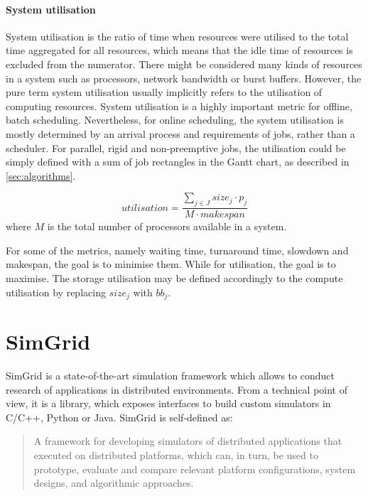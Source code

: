 \documentclass[thesis-en.tex]{subfiles}
\begin{document}
\paragraph{System utilisation}
System utilisation is the ratio of time when resources were utilised to the total time aggregated for all resources, which means that the idle time of resources is excluded from the numerator. There might be considered many kinds of resources in a system such as processors, network bandwidth or burst buffers. However, the pure term system utilisation usually implicitly refers to the utilisation of computing resources. System utilisation is a highly important metric for offline, batch scheduling. Nevertheless, for online scheduling, the system utilisation is mostly determined by an arrival process and requirements of jobs, rather than a scheduler. For parallel, rigid and non-preemptive jobs, the utilisation could be simply defined with a sum of job rectangles in the Gantt chart, as described in \autoref{sec:algorithms}.

\begin{equation} \label{eq:utilisation}
    utilisation = \frac{ \sum_{j \in J} size_j \cdot p_j }{ M \cdot makespan }
\end{equation}
where $M$ is the total number of processors available in a system.

\bigskip

For some of the metrics, namely waiting time, turnaround time, slowdown and makespan, the goal is to minimise them. While for utilisation, the goal is to maximise. The storage utilisation may be defined accordingly to the compute utilisation by replacing $size_j$ with $bb_j$.

\section{SimGrid} \label{sec:simgrid}
SimGrid \cite{casanova:hal-01017319} is a state-of-the-art simulation framework which allows to conduct research of applications in distributed environments. From a technical point of view, it is a library, which exposes interfaces to build custom simulators in C/C++, Python or Java. SimGrid is self-defined as:
\begin{quote}
A framework for developing simulators of distributed applications that executed on distributed platforms, which can, in turn, be used to prototype, evaluate and compare relevant platform configurations, system designs, and algorithmic approaches.
\end{quote}
\end{document}

